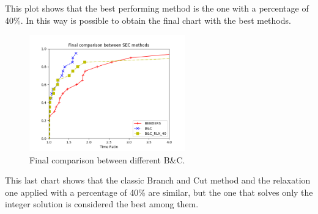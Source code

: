 This plot shows that the best performing method is the one with a percentage of 40\%. In this way is possible to obtain the final chart with the best methods.

\begin{figure}[h]
	\centering
	\includegraphics[width=0.6\textwidth]{images/final_final_SEC.png}
	\caption{Final comparison between different B\&C.}
	\label{fig:result-final-bac}
\end{figure}

This last chart shows that the classic Branch and Cut method and the relaxation one applied with a percentage of 40\% are similar, but the one that solves only the integer solution is considered the best among them.

